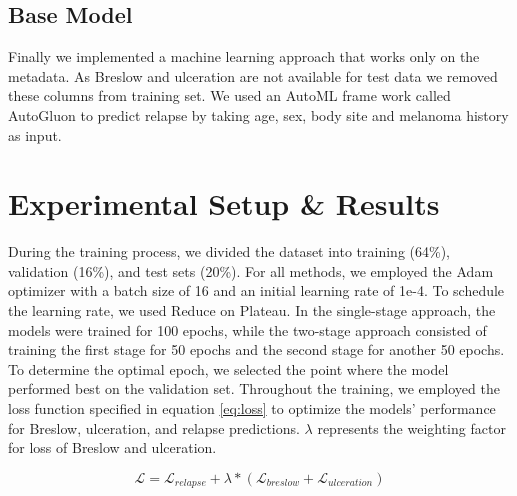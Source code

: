 \documentclass[conference]{IEEEtran}
\begin{document}
\subsection{Base Model}
Finally we implemented a machine learning approach that works only on the metadata. As Breslow and ulceration are not available for test data we removed these columns from training set. We used an AutoML frame work called AutoGluon \cite{b7} to predict relapse by taking age, sex, body site and melanoma history as input.



\section{Experimental Setup \& Results }
During the training process, we divided the dataset into training (64\%), validation (16\%), and test sets (20\%). For all methods, we employed the Adam optimizer with a batch size of 16 and an initial learning rate of 1e-4. To schedule the learning rate, we used Reduce on Plateau. In the single-stage approach, the models were trained for 100 epochs, while the two-stage approach consisted of training the first stage for 50 epochs and the second stage for another 50 epochs. To determine the optimal epoch, we selected the point where the model performed best on the validation set. Throughout the training, we employed the loss function specified in equation \ref{eq:loss} to optimize the models' performance for Breslow, ulceration, and relapse predictions. $\lambda$ represents the weighting factor for loss of Breslow and ulceration. 

\begin{equation}
        \mathcal{L} = \mathcal{L}_{relapse} + \lambda * \left( \mathcal{L}_{breslow} + \mathcal{L}_{ulceration}\right)
        \label{eq:loss}
\end{equation}
\end{document}
